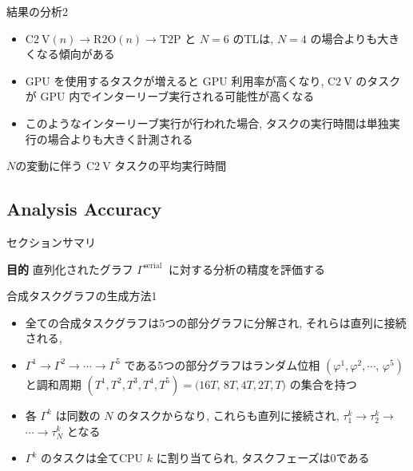 \begin{frame}{結果の分析2}
    \begin{itemize}
        \item $\mathrm{C} 2 \mathrm{~V}(n) \rightarrow \mathrm{R} 2 \mathrm{O}(n) \rightarrow \mathrm{T} 2 \mathrm{P}$ と $N=6$ のTLは, $N=4$ の場合よりも大きくなる傾向がある
        \item GPU を使用するタスクが増えると GPU 利用率が高くなり, $\mathrm{C} 2 \mathrm{~V}$ のタスクが GPU 内でインターリーブ実行される可能性が高くなる
        \item このようなインターリーブ実行が行われた場合, タスクの実行時間は単独実行の場合よりも大きく計測される
    \end{itemize}
\end{frame}

\begin{frame}{$N$の変動に伴う $\mathrm{C} 2 \mathrm{~V}$ タスクの平均実行時間}
\end{frame}


\subsection{Analysis Accuracy}
\label{ssec: analysis accuracy}

\begin{frame}{セクションサマリ}
    \begin{itembox}[l]{\textbf{目的}}
        直列化されたグラフ $\Gamma^{\text {serial }}$ に対する分析の精度を評価する
    \end{itembox}
\end{frame}

\begin{frame}{合成タスクグラフの生成方法1}
    \begin{itemize}
        \item 全ての合成タスクグラフは5つの部分グラフに分解され, それらは直列に接続される,
        \item $\Gamma^{1} \rightarrow \Gamma^{2} \rightarrow \cdots \rightarrow \Gamma^{5}$ である5つの部分グラフはランダム位相 $\left(\varphi^{1}, \varphi^{2}, \cdots\right.$, $\left.\varphi^{5}\right)$ と調和周期 $\left(T^{1}, T^{2}, T^{3}, T^{4}, T^{5}\right)=(16 T$, $8 T, 4 T, 2 T, T)$ の集合を持つ
        \item 各 $\Gamma^{k}$ は同数の $N$ のタスクからなり, これらも直列に接続され, $\tau_{1}^{k} \rightarrow \tau_{2}^{k} \rightarrow$  $\cdots \rightarrow \tau_{N}^{k}$ となる
        \item $\Gamma^{k}$ のタスクは全てCPU $k$ に割り当てられ, タスクフェーズは0である
    \end{itemize}
\end{frame}

